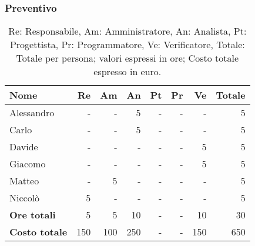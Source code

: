 \subsubsection{Preventivo}

\begin{table}[H]
	\centering
	\begin{tabular}{l|r|r|r|r|r|r|r}
	\textbf{Nome} & \textbf{Re} & \textbf{Am} & \textbf{An} & \textbf{Pt} & \textbf{Pr} & \textbf{Ve} & \textbf{Totale} \\
	\hline
		Alessandro & - & - & 5 & - & - & - & 5 \\
		Carlo & - & - & 5 & - & - & - & 5 \\
		Davide & - & - & - & - & - & 5 & 5 \\
		Giacomo & - & - & - & - & - & 5 & 5 \\
		Matteo & - & 5 & - & - & - & - & 5 \\
		Niccolò & 5 & - & - & - & - & - & 5 \\
	\hline
	\textbf{Ore totali} & 5 & 5 & 10 & - & - & 10 & 30 \\
	\textbf{Costo totale} & 150 & 100 & 250 & - & - & 150 & 650
	\end{tabular}
	\caption{Re: Responsabile, Am: Amministratore, An: Analista, Pt: Progettista,
		Pr: Programmatore, Ve: Verificatore, Totale: Totale per persona; valori espressi in ore; Costo totale espresso in euro.} 
\end{table}

